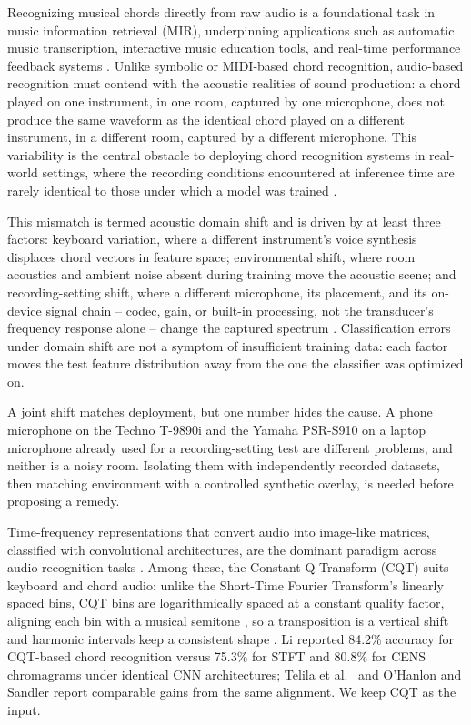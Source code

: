 \documentclass[pdflatex,sn-mathphys-num,iicol]{sn-jnl}
\theoremstyle{thmstyleone}
\theoremstyle{thmstyletwo}
\theoremstyle{thmstylethree}
\begin{document}
Recognizing musical chords directly from raw audio is a foundational task in music information retrieval (MIR), underpinning applications such as automatic music transcription, interactive music education tools, and real-time performance feedback systems \cite{Telila2023}\cite{Saputra2021}\cite{Moysis2023}. Unlike symbolic or MIDI-based chord recognition, audio-based recognition must contend with the acoustic realities of sound production: a chord played on one instrument, in one room, captured by one microphone, does not produce the same waveform as the identical chord played on a different instrument, in a different room, captured by a different microphone. This variability is the central obstacle to deploying chord recognition systems in real-world settings, where the recording conditions encountered at inference time are rarely identical to those under which a model was trained \cite{Kusaka2024}.

This mismatch is termed acoustic domain shift and is driven by at least three factors: keyboard variation, where a different instrument's voice synthesis displaces chord vectors in feature space; environmental shift, where room acoustics and ambient noise absent during training move the acoustic scene; and recording-setting shift, where a different microphone, its placement, and its on-device signal chain -- codec, gain, or built-in processing, not the transducer's frequency response alone -- change the captured spectrum \cite{Kusaka2024}\cite{Majchrzak2025}. Classification errors under domain shift are not a symptom of insufficient training data: each factor moves the test feature distribution away from the one the classifier was optimized on.

A joint shift matches deployment, but one number hides the cause. A phone microphone on the Techno T-9890i and the Yamaha PSR-S910 on a laptop microphone already used for a recording-setting test are different problems, and neither is a noisy room. Isolating them with independently recorded datasets, then matching environment with a controlled synthetic overlay, is needed before proposing a remedy.

Time-frequency representations that convert audio into image-like matrices, classified with convolutional architectures, are the dominant paradigm across audio recognition tasks \cite{Wolf-Monheim2025}\cite{Zaman2023}\cite{Moysis2023}. Among these, the Constant-Q Transform (CQT) suits keyboard and chord audio: unlike the Short-Time Fourier Transform's linearly spaced bins, CQT bins are logarithmically spaced at a constant quality factor, aligning each bin with a musical semitone \cite{Lacoste2007}, so a transposition is a vertical shift and harmonic intervals keep a consistent shape \cite{Li2021}. Li \cite{Li2021} reported 84.2\% accuracy for CQT-based chord recognition versus 75.3\% for STFT and 80.8\% for CENS chromagrams under identical CNN architectures; Telila et al.\ \cite{Telila2023} and O'Hanlon and Sandler \cite{OHanlon2021} report comparable gains from the same alignment. We keep CQT as the input.
\end{document}
